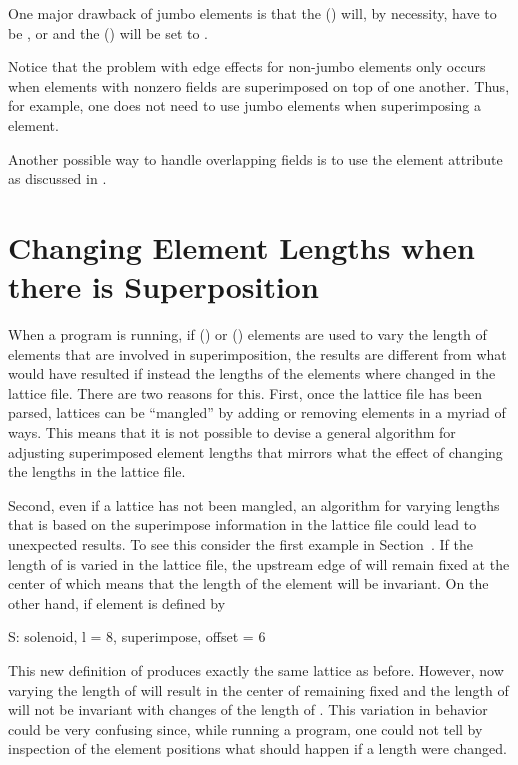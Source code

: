 One major drawback of jumbo  elements is that the 
() will, by necessity, have to be , or  and the
 () will be set to .

Notice that the problem with edge effects for non-jumbo  elements only occurs when
elements with nonzero fields are superimposed on top of one another. Thus, for example, one does not
need to use jumbo elements when superimposing a  element.

Another possible way to handle overlapping fields is to use the  element
attribute as discussed in .

\section{Changing Element Lengths when there is Superposition}
\label{c:super.length}

When a program is running, if  () or  ()
elements are used to vary the length of elements that are involved in superimposition, the results
are different from what would have resulted if instead the lengths of the elements where changed in
the lattice file. There are two reasons for this. First, once the lattice file has been parsed,
lattices can be ``mangled'' by adding or removing elements in a myriad of ways. This means that it
is not possible to devise a general algorithm for adjusting superimposed element lengths that
mirrors what the effect of changing the lengths in the lattice file.

Second, even if a lattice has not been mangled, an algorithm for varying lengths that is based on
the superimpose information in the lattice file could lead to unexpected results. To see this
consider the first example in Section~. If the length of  is varied in the
lattice file, the upstream edge of  will remain fixed at the center of  which means that
the length of the  element  will be invariant. On the other hand, if
element  is defined by
\begin{example}
  S: solenoid, l = 8, superimpose, offset = 6
\end{example}
This new definition of  produces exactly the same lattice as before. However, now varying the
length of  will result in the center of  remaining fixed and the length of 
will not be invariant with changes of the length of . This variation in behavior could be very
confusing since, while running a program, one could not tell by inspection of the element positions
what should happen if a length were changed.

